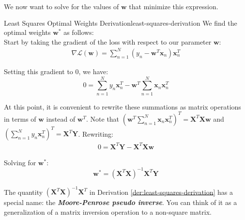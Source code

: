 
We now want to solve for the values of $\textbf{w}$ that minimize this expression.

\begin{derivation}{Least Squares Optimal Weights Derivation}{least-squares-derivation}
    We find the optimal weights $\textbf{w}^{*}$ as follows: \\

    Start by taking the gradient of the loss with respect to our parameter $\textbf{w}$:
    \begin{align*}
        \nabla \mathcal{L}(\textbf{w}) = \sum_{n=1}^{N} (y_{n} - \textbf{w}^{T}\textbf{x}_{n})\textbf{x}_{n}^{T}
    \end{align*}

    Setting this gradient to 0, we have:
    \begin{equation} \label{least-squares-solving-for-w}
        0 = \sum_{n=1}^{N} y_{n} \textbf{x}_{n}^{T} - \textbf{w}^{T} \sum_{n=1}^{N} \textbf{x}_{n}\textbf{x}_{n}^{T}
    \end{equation}

    At this point, it is convenient to rewrite these summations as matrix operations in terms of $\textbf{w}$ instead of $\textbf{w}^{T}$. Note that $(\textbf{w}^{T} \sum_{n=1}^{N} \textbf{x}_{n}\textbf{x}_{n}^{T})^{T} = \textbf{X}^{T}\textbf{X}\textbf{w}$ and $(\sum_{n=1}^{N} y_{n} \textbf{x}_{n}^{T})^{T} = \textbf{X}^{T}\textbf{Y}$. Rewriting:
    \begin{align*}
        0 = \textbf{X}^{T}\textbf{Y} - \textbf{X}^{T}\textbf{X}\textbf{w}
    \end{align*}

    Solving for $\textbf{w}^{*}$:
    \begin{equation} \label{least-squares-solved-for-w}
        \textbf{w}^{*} = (\textbf{X}^{T}\textbf{X})^{-1}\textbf{X}^{T}\textbf{Y}
    \end{equation}
\end{derivation}

The quantity $(\textbf{X}^{T}\textbf{X})^{-1}\textbf{X}^{T}$ in Derivation \ref{der:least-squares-derivation} has a special name: the \textbf{\textit{Moore-Penrose pseudo inverse}}. You can think of it as a generalization of a matrix inversion operation to a non-square matrix.

